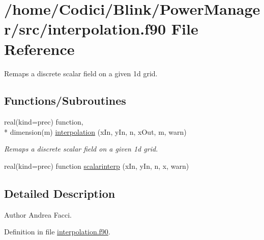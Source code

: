\hypertarget{interpolation_8f90}{\section{/home/\-Codici/\-Blink/\-Power\-Manager/src/interpolation.f90 File Reference}
\label{interpolation_8f90}
}


Remaps a discrete scalar field on a given 1d grid.  


\subsection*{Functions/\-Subroutines}
\begin{DoxyCompactItemize}
\item 
real(kind=prec) function, \\*
dimension(m) \hyperlink{interpolation_8f90_af82151c6134b883711c2a1fa732ca69a}{interpolation} (x\-In, y\-In, n, x\-Out, m, warn)
\begin{DoxyCompactList}\small\item\em Remaps a discrete scalar field on a given 1d grid. \end{DoxyCompactList}\item 
real(kind=prec) function \hyperlink{interpolation_8f90_aad4c77c5bcdbd72c8d4ab3b3cb23585c}{scalarinterp} (x\-In, y\-In, n, x, warn)
\end{DoxyCompactItemize}


\subsection{Detailed Description}
\begin{DoxyAuthor}{Author}
Andrea Facci. 
\end{DoxyAuthor}


Definition in file \hyperlink{interpolation_8f90_source}{interpolation.\-f90}.



